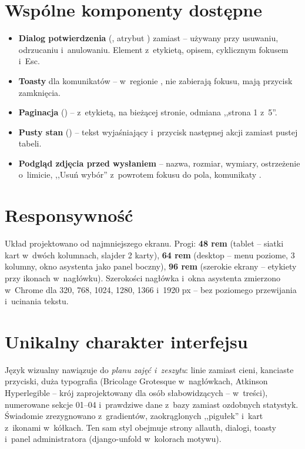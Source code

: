 \section{Wspólne komponenty dostępne}

\begin{itemize}
  \item \textbf{Dialog potwierdzenia} (, atrybut
        ) zamiast  -- używany przy usuwaniu, odrzucaniu
        i~anulowaniu. Element  z~etykietą, opisem, cyklicznym fokusem i~Esc.
  \item \textbf{Toasty} dla komunikatów  -- w~regionie
        , nie zabierają fokusu, mają przycisk zamknięcia.
  \item \textbf{Paginacja} () --  z~etykietą,
         na bieżącej stronie, odmiana ,,strona 1 z~5''.
  \item \textbf{Pusty stan} () -- tekst wyjaśniający
        i~przycisk następnej akcji zamiast pustej tabeli.
  \item \textbf{Podgląd zdjęcia przed wysłaniem} -- nazwa, rozmiar, wymiary, ostrzeżenie
        o~limicie, ,,Usuń wybór'' z~powrotem fokusu do pola, komunikaty .
\end{itemize}

\section{Responsywność}

Układ projektowano od najmniejszego ekranu. Progi: \textbf{48 rem} (tablet -- siatki
kart w~dwóch kolumnach, slajder 2 karty), \textbf{64 rem} (desktop -- menu poziome,
3 kolumny, okno asystenta jako panel boczny), \textbf{96 rem} (szerokie ekrany -- etykiety
przy ikonach w~nagłówku). Szerokości nagłówka i~okna asystenta zmierzono w~Chrome
dla 320, 768, 1024, 1280, 1366 i~1920 px -- bez poziomego przewijania i~ucinania tekstu.

\section{Unikalny charakter interfejsu}

Język wizualny nawiązuje do \emph{planu zajęć i~zeszytu}: linie zamiast cieni, kanciaste
przyciski, duża typografia (Bricolage Grotesque w~nagłówkach, Atkinson Hyperlegible -- krój
zaprojektowany dla osób słabowidzących -- w~treści), numerowane sekcje 01--04 i~prawdziwe
dane z~bazy zamiast ozdobnych statystyk. Świadomie zrezygnowano z~gradientów, zaokrąglonych
,,pigułek'' i~kart z~ikonami w~kółkach. Ten sam styl obejmuje strony allauth, dialogi,
toasty i~panel administratora (django-unfold w~kolorach motywu).
